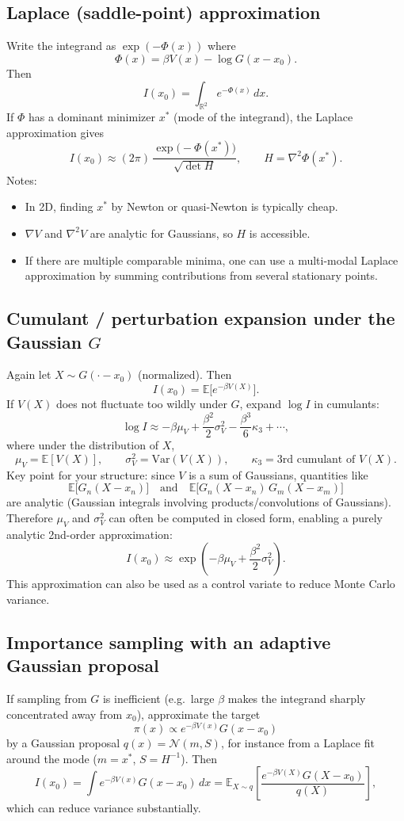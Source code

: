 \documentclass[twocolumn]{notes}
\begin{document}
\subsection{Laplace (saddle-point) approximation}
Write the integrand as $\exp(-\Phi(x))$ where
\[
\Phi(x)=\beta V(x)-\log G(x-x_0).
\]
Then
\[
I(x_0)=\int_{\mathbb R^2} e^{-\Phi(x)}\,dx.
\]
If $\Phi$ has a dominant minimizer $x^*$ (mode of the integrand), the Laplace approximation gives
\[
I(x_0)\approx (2\pi)\,\frac{\exp\!\big(-\Phi(x^*)\big)}{\sqrt{\det H}},
\qquad H=\nabla^2\Phi(x^*).
\]
Notes:
\begin{itemize}
\item In 2D, finding $x^*$ by Newton or quasi-Newton is typically cheap.
\item $\nabla V$ and $\nabla^2 V$ are analytic for Gaussians, so $H$ is accessible.
\item If there are multiple comparable minima, one can use a multi-modal Laplace approximation by summing contributions from several stationary points.
\end{itemize}

\subsection{Cumulant / perturbation expansion under the Gaussian $G$}
Again let $X\sim G(\cdot-x_0)$ (normalized). Then
\[
I(x_0)=\mathbb E\big[e^{-\beta V(X)}\big].
\]
If $V(X)$ does not fluctuate too wildly under $G$, expand $\log I$ in cumulants:
\[
\log I \approx -\beta \mu_V + \frac{\beta^2}{2}\sigma_V^2 - \frac{\beta^3}{6}\kappa_3+\cdots,
\]
where under the distribution of $X$,
\[
\mu_V=\mathbb E[V(X)],\qquad \sigma_V^2=\mathrm{Var}(V(X)),\qquad \kappa_3=\text{3rd cumulant of }V(X).
\]
Key point for your structure: since $V$ is a sum of Gaussians, quantities like
\[
\mathbb E\big[G_n(X-x_n)\big]
\quad\text{and}\quad
\mathbb E\big[G_n(X-x_n)\,G_m(X-x_m)\big]
\]
are analytic (Gaussian integrals involving products/convolutions of Gaussians). Therefore $\mu_V$ and $\sigma_V^2$ can often be computed in closed form, enabling a purely analytic 2nd-order approximation:
\[
I(x_0)\approx \exp\!\left(-\beta \mu_V + \frac{\beta^2}{2}\sigma_V^2\right).
\]
This approximation can also be used as a control variate to reduce Monte Carlo variance.

\subsection{Importance sampling with an adaptive Gaussian proposal}
If sampling from $G$ is inefficient (e.g.\ large $\beta$ makes the integrand sharply concentrated away from $x_0$), approximate the target
\[
\pi(x)\propto e^{-\beta V(x)}G(x-x_0)
\]
by a Gaussian proposal $q(x)=\mathcal N(m,S)$, for instance from a Laplace fit around the mode ($m=x^*$, $S=H^{-1}$). Then
\[
I(x_0)=\int e^{-\beta V(x)}G(x-x_0)\,dx
= \mathbb E_{X\sim q}\left[\frac{e^{-\beta V(X)}G(X-x_0)}{q(X)}\right],
\]
which can reduce variance substantially.
\end{document}
